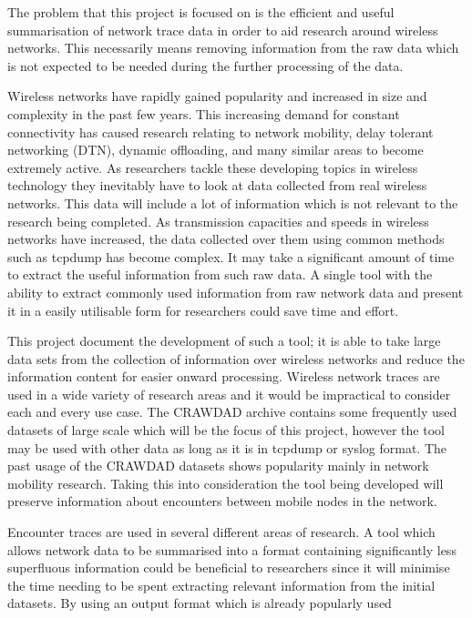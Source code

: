 The problem that this project is focused on is the efficient and useful summarisation of network trace data in order to aid research around wireless networks. This necessarily means removing information from the raw data which is not expected to be needed during the further processing of the data.

Wireless networks have rapidly gained popularity and increased in size and complexity in the past few years. This increasing demand for constant connectivity has caused research relating to network mobility, delay tolerant networking (DTN), dynamic offloading, and many similar areas to become extremely active. As researchers tackle these developing topics in wireless technology they inevitably have to look at data collected from real wireless networks. This data will include a lot of information which is not relevant to the research being completed. As transmission capacities and speeds in wireless networks have increased, the data collected over them using common methods such as tcpdump has become complex. It may take a significant amount of time to extract the useful information from such raw data. A single tool with the ability to extract commonly used information from raw network data and present it in a easily utilisable form for researchers could save time and effort.

This project document the development of such a tool; it is able to take large data sets from the collection of information over wireless networks and reduce the information content for easier onward processing. Wireless network traces are used in a wide variety of research areas and it would be impractical to consider each and every use case. The CRAWDAD archive contains some frequently used datasets of large scale which will be the focus of this project, however the tool may be used with other data as long as it is in tcpdump or syslog format. The past usage of the CRAWDAD datasets shows popularity mainly in network mobility research. Taking this into consideration the tool being developed will preserve information about encounters between mobile nodes in the network.

Encounter traces are used in several different areas of research. A tool which allows network data to be summarised into a format containing significantly less superfluous information could be beneficial to researchers since it will minimise the time needing to be spent extracting relevant information from the initial datasets. By using an output format which is already popularly used 

